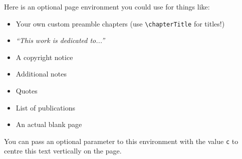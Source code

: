 
\begin{blankpage}
	Here is an optional page environment you could use for things like:
	\begin{itemize}
		\item Your own custom preamble chapters (use \texttt{\textbackslash chapterTitle} for titles!)
		\item \emph{``This work is dedicated to...''}
		\item A copyright notice
		\item Additional notes
		\item Quotes
		\item List of publications
		\item An actual blank page
	\end{itemize}
	You can pass an optional parameter to this environment with the value \texttt{c} to centre this text vertically on the page.
\end{blankpage}